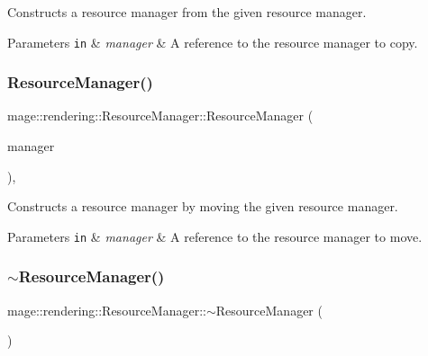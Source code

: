 Constructs a resource manager from the given resource manager.


\begin{DoxyParams}[1]{Parameters}
\mbox{\tt in}  & {\em manager} & A reference to the resource manager to copy. \\
\hline
\end{DoxyParams}
\hypertarget{classmage_1_1rendering_1_1_resource_manager_a3d54199cf484d11c1d1039eeb306016c}{}\label{classmage_1_1rendering_1_1_resource_manager_a3d54199cf484d11c1d1039eeb306016c} 
\subsubsection{\texorpdfstring{Resource\+Manager()}{ResourceManager()}\hspace{0.1cm}{\footnotesize\ttfamily [3/3]}}
{\footnotesize\ttfamily mage\+::rendering\+::\+Resource\+Manager\+::\+Resource\+Manager (\begin{DoxyParamCaption}\item[{\hyperlink{classmage_1_1rendering_1_1_resource_manager}{Resource\+Manager} \&\&}]{manager }\end{DoxyParamCaption})\hspace{0.3cm}{\ttfamily [default]}, {\ttfamily [noexcept]}}

Constructs a resource manager by moving the given resource manager.


\begin{DoxyParams}[1]{Parameters}
\mbox{\tt in}  & {\em manager} & A reference to the resource manager to move. \\
\hline
\end{DoxyParams}
\hypertarget{classmage_1_1rendering_1_1_resource_manager_a7289ca2a270e6de613eff041ba04d4a4}{}\label{classmage_1_1rendering_1_1_resource_manager_a7289ca2a270e6de613eff041ba04d4a4} 
\subsubsection{\texorpdfstring{$\sim$\+Resource\+Manager()}{~ResourceManager()}}
{\footnotesize\ttfamily mage\+::rendering\+::\+Resource\+Manager\+::$\sim$\+Resource\+Manager (\begin{DoxyParamCaption}{ }\end{DoxyParamCaption})\hspace{0.3cm}{\ttfamily [default]}}

